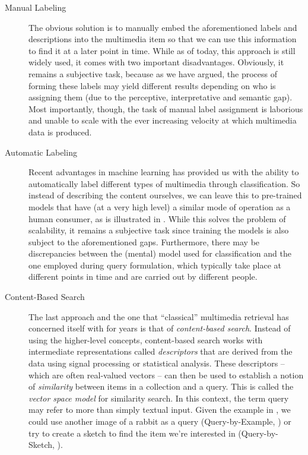 \begin{description}
    \item[Manual Labeling] The obvious solution is to manually embed the aforementioned labels and descriptions into the multimedia item so that we can use this information to find it at a later point in time. While as of today, this approach is still widely used, it comes with two important disadvantages. Obviously, it remains a subjective task, because as we have argued, the process of forming these labels may yield different results depending on who is assigning them (due to the perceptive, interpretative and semantic gap). Most importantly, though, the task of manual label assignment is laborious and unable to scale with the ever increasing velocity at which multimedia data is produced.
    \item[Automatic Labeling] Recent advantages in machine learning has provided us with the ability to automatically label different types of multimedia through classification. So instead of describing the content ourselves, we can leave this to pre-trained models that have (at a very high level) a similar mode of operation as a human consumer, as is illustrated in . While this solves the problem of scalability, it remains a subjective task since training the models is also subject to the aforementioned gaps. Furthermore, there may be discrepancies between the (mental) model used for classification and the one employed during query formulation, which typically take place at different points in time and are carried out by different people.
    \item[Content-Based Search] The last approach and the one that ``classical'' multimedia retrieval has concerned itself with for years is that of \emph{content-based search}. Instead of using the higher-level concepts, content-based search works with intermediate representations called \emph{descriptors} that are derived from the data using signal processing or statistical analysis. These descriptors -- which are often real-valued vectors -- can then be used to establish a notion of \emph{similarity} between items in a collection and a query. This is called  the \emph{vector space model} for similarity search. In this context, the term query may refer to more than simply textual input. Given the example in , we could use another image of a rabbit as a query (Query-by-Example, \cite{Kelly:1995Query}) or try to create a sketch to find the item we're interested in (Query-by-Sketch, \cite{Sciascio:1999Content}).
\end{description}

